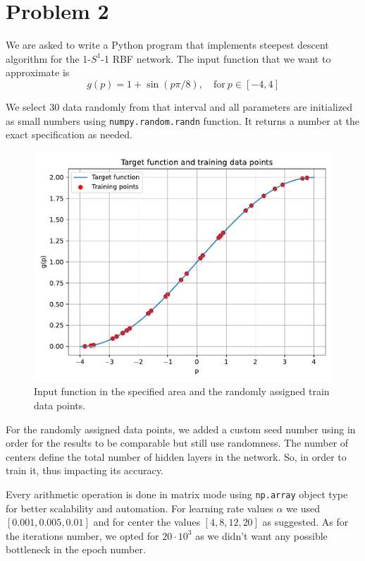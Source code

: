 \section{Problem 2}

We are asked to write a Python program that implements steepest descent algorithm for the 1-$S^1$-1 RBF network.
The input function that we want to approximate is 
\[
g(p) = 1 + \sin\left(p\pi/8\right), \quad \text{for} \ p \in \left[-4,4\right]
\]

We select 30 data randomly from that interval and all parameters are initialized as small numbers using \verb|numpy.random.randn| function. It returns a number at the exact specification as needed.

\begin{figure}[htbp]
	\centering
	\includegraphics[width=0.6\linewidth]{../Problem 2/prob2_targetFunc_dataPoints.pdf}
	\caption{Input function in the specified area and the randomly assigned train data points.}
\end{figure}

For the randomly assigned data points, we added a custom seed number using in order for the results to be comparable but still use randomness.
The number of centers define the total number of hidden layers in the network. So, in order to train it, thus impacting its accuracy.

Every arithmetic operation is done in matrix mode using \verb|np.array| object type for better scalability and automation.
For learning rate values $\alpha$ we used $\left[0.001, 0.005, 0.01\right]$ and for center the values $\left[4, 8, 12, 20\right]$ as suggested. As for the iterations number, we opted for $20\cdot 10^3$ as we didn't want any possible bottleneck in the epoch number.


